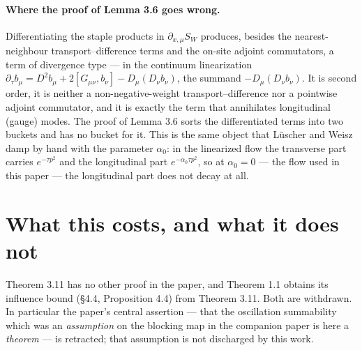 \documentclass[11pt]{article}
\begin{document}
\paragraph{Where the proof of Lemma 3.6 goes wrong.}
Differentiating the staple products in $\partial_{x,\mu}S_W$ produces, besides the
nearest-neighbour transport--difference terms and the on-site adjoint commutators, a
term of divergence type --- in the continuum linearization
$\partial_\tau b_\mu=D^2b_\mu+2[G_{\mu\nu},b_\nu]-D_\mu(D_\nu b_\nu)$, the summand
$-D_\mu(D_\nu b_\nu)$. It is second order, it is neither a non-negative-weight
transport--difference nor a pointwise adjoint commutator, and it is exactly the term
that annihilates longitudinal (gauge) modes. The proof of Lemma 3.6 sorts the
differentiated terms into two buckets and has no bucket for it. This is the same
object that L\"uscher and Weisz damp by hand with the parameter $\alpha_0$: in the
linearized flow the transverse part carries $e^{-\tau p^2}$ and the longitudinal part
$e^{-\alpha_0\tau p^2}$, so at $\alpha_0=0$ --- the flow used in this paper --- the
longitudinal part does not decay at all.

\section{What this costs, and what it does not}

Theorem 3.11 has no other proof in the paper, and Theorem 1.1 obtains its influence
bound (\S4.4, Proposition 4.4) from Theorem 3.11. Both are withdrawn. In particular
the paper's central assertion --- that the oscillation summability which was an
\emph{assumption} on the blocking map in the companion paper is here a \emph{theorem}
--- is retracted; that assumption is not discharged by this work.
\end{document}
